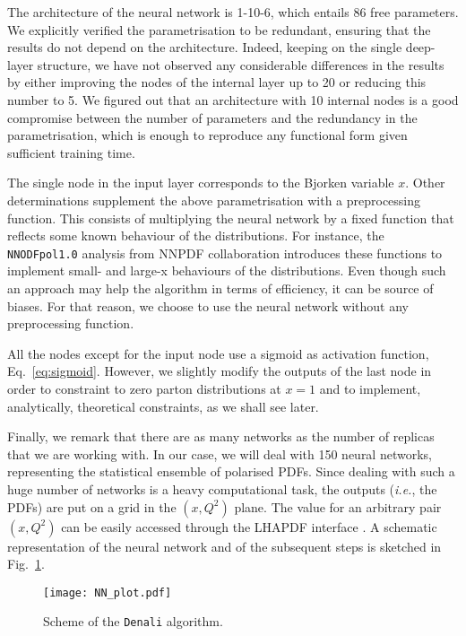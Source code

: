The architecture of the neural network is 1-10-6, which entails 86 free parameters. We explicitly verified the parametrisation to be redundant, ensuring that the results do not depend on the architecture. Indeed, keeping on the single deep-layer structure, we have not observed any considerable differences in the results by either improving the nodes of the internal layer up to 20 or reducing this number to 5. We figured out that an architecture with 10 internal nodes is a good compromise between the number of parameters and the redundancy in the parametrisation, which is enough to reproduce any functional form given sufficient training time.%

The single node in the input layer corresponds to the Bjorken variable $x$. Other determinations supplement the above parametrisation with a preprocessing function. This consists of multiplying the neural network by a fixed function that reflects some known behaviour of the distributions. For instance, the \texttt{NNODFpol1.0} analysis from NNPDF collaboration \cite{Nocera:2014gqa} introduces these functions to implement small- and large-x behaviours of the distributions. Even though such an approach may help the algorithm in terms of efficiency, it can be source of biases. For that reason, we choose to use the neural network without any preprocessing function.%

All the nodes except for the input node use a sigmoid as activation function, Eq.~\eqref{eq:sigmoid}. However, we slightly modify the outputs of the last node in order to constraint to zero parton distributions at $x=1$ and to implement, analytically, theoretical constraints, as we shall see later.%

Finally, we remark that there are as many networks as the number of replicas that we are working with. In our case, we will deal with 150 neural networks, representing the statistical ensemble of polarised PDFs. Since dealing with such a huge number of networks is a heavy computational task, the outputs (\textit{i.e.}, the PDFs) are put on a grid in the $(x,Q^2)$ plane. The value for an arbitrary pair $(x,Q^2)$ can be easily accessed through the LHAPDF interface \cite{Buckley:2014ana}. A schematic representation of the neural network and of the subsequent steps is sketched in Fig.~\ref{fig:NN_plot}.
\begin{figure}[t]
  \centering
  \texttt{[image: NN\_plot.pdf]} 
  \caption{\small{Scheme of the \texttt{Denali} algorithm.}}
  \label{fig:NN_plot}
\end{figure}

